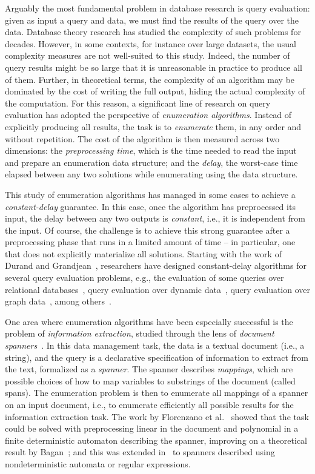 Arguably the most fundamental problem in database research is query
evaluation: given as input a query and data, we must find the results of the query over the data.
Database theory research has studied the complexity of such problems for 
decades.
However, in some contexts, for instance over large datasets, the usual
complexity measures are not well-suited to this study.
Indeed, the number of query results might be so large that it is unreasonable in
practice to produce all of them.
Further, in theoretical terms, the complexity of an algorithm may be dominated by the cost of writing
the full output, hiding the actual complexity of the
computation.
For this reason, a significant line of research on query evaluation has adopted the perspective of \emph{enumeration algorithms}.
Instead of explicitly producing all results, the task is to \emph{enumerate} them, in any order and without repetition.
The cost of the algorithm is then measured across two dimensions: the
\emph{preprocessing time}, which is the time needed to read the input and
prepare an enumeration data structure; and the \emph{delay}, the worst-case time
elapsed between any two solutions while enumerating using the data structure.

This study of enumeration algorithms has managed in some cases to achieve a
\emph{constant-delay} guarantee. In this case, once the algorithm has
preprocessed its input, the delay between any two outputs is \emph{constant},
i.e., it is independent from the input. Of course, the challenge is to achieve
this strong guarantee after a preprocessing phase that runs in a limited amount
of time -- in particular, one that does not explicitly materialize all solutions.
%
Starting with the work of Durand and Grandjean~\cite{durand2007first}, researchers have designed
constant-delay algorithms for several query evaluation problems, e.g., the evaluation of some queries over relational databases~\cite{bagan2007acyclic,kara2020trade}, query evaluation over dynamic data~\cite{berkholz2017answering,idris2017dynamic}, query evaluation over graph data~\cite{hartig2018semantics,kroll2016complexity}, among others~\cite{Segoufin13}. 

One area where enumeration algorithms have been especially successful is the problem of \emph{information extraction}, studied through the lens of \emph{document spanners}~\cite{FaginKRV15}. In this data management task, the data is a textual document (i.e., a string), and the query is a declarative specification of information to extract from the text, formalized as a \emph{spanner}. The spanner describes \emph{mappings}, which are possible choices of how to map variables to substrings of the document (called spans). The enumeration problem is then to enumerate all mappings of a spanner on an input document, i.e., to enumerate efficiently all possible results for the information extraction task.
%
The work by Florenzano et al.~\cite{FlorenzanoRUVV18} showed that the task could be solved with preprocessing linear in the document and polynomial in a finite deterministic automaton describing the spanner, improving on a theoretical result by Bagan~\cite{bagan2006mso}; and 
this was extended in~\cite{amarilli2019constant} to spanners described using nondeterministic automata or regular expressions.

